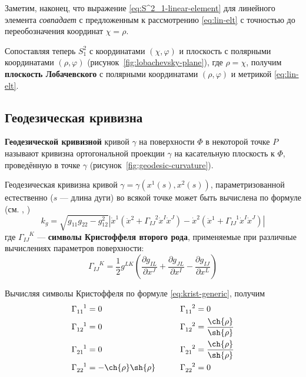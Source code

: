 \documentclass{article}
\numberwithin{equation}{section}
\renewcommand{\phi}{\varphi}
\newcommand{\krist}[3]{\Gamma^{\phantom{#1 #2}#3}_{#1 #2}}
\newcommand{\neword}[1]{\textbf{#1}}
\providecommand{\abs}[1]{\left \lvert{#1}\right \rvert}
\begin{document}
Заметим, наконец, что выражение \eqref{eq:S^2_1-linear-element} для
линейного элемента \emph{совпадает} с предложенным к рассмотрению
\eqref{eq:lin-elt} с точностью до переобозначения координат $\chi =
\rho$.

Сопоставляя теперь $S^2_1$ с координатами $(\chi, \phi)$ и плоскость с
полярными координатами $(\rho, \phi)$
(рисунок \ref{fig:lobachevsky-plane}), где $\rho=\chi$, получим
\neword{плоскость Лобачевского} с полярными координатами $(\rho,
\phi)$ и метрикой \eqref{eq:lin-elt}.

\subsection{Геодезическая кривизна}

\neword{Геодезической кривизной} кривой $\gamma$ на поверхности $\Phi$
в некоторой точке $P$ называют кривизна ортогональной проекции
$\gamma$ на касательную плоскость к $\Phi$, проведённую в точке
$\gamma$ (рисунок \ref{fig:geodesic-curvature}).



Геодезическая кривизна кривой $\gamma = \gamma(x^1(s), x^2(s))$,
параметризованной естественно ($s$ — длина дуги) во всякой точке может
быть вычислена по формуле (см. \cite{pogorelov74}, \cite{rashevsky50})
\begin{equation}\label{eq:geodesic-curvature}
  k_g = \sqrt{g_{11} g_{22} - g_{12}^2}\abs{\dot{x}^1 (\ddot{x}^2 +
    \krist{I}{J}{2} \dot{x}^I \dot{x}^J) - \dot{x}^2 (\ddot{x}^1 +
    \krist{I}{J}{1} \dot{x}^I \dot{x}^J)}
\end{equation}
где $\krist{I}{J}{K}$ — \neword{символы Кристоффеля второго рода},
применяемые при различные вычислениях параметров поверхности:
\begin{equation}\label{eq:krist-generic}
  \krist{I}{J}{K} = \frac{1}{2} g^{LK} \left (
    \frac{\partial{g_{IL}}}{\partial{x^J}} +
    \frac{\partial{g_{JL}}}{\partial{x^I}} -
    \frac{\partial{g_{IJ}}}{\partial{x^L}} \right )
\end{equation}

Вычисляя символы Кристоффеля по формуле \eqref{eq:krist-generic},
получим
\begin{equation}\label{eq:krist}
  \begin{aligned}
    \krist{1}{1}{1} &= 0 &\qquad \krist{1}{1}{2} &= 0 \\
    \krist{1}{2}{1} &= 0 &\qquad \krist{1}{2}{2} &= \frac{\ch{\rho}}{\sh{\rho}} \\
    \krist{2}{1}{1} &= 0 &\qquad \krist{2}{1}{2} &= \frac{\ch{\rho}}{\sh{\rho}} \\
    \krist{2}{2}{1} &= -\ch{\rho} \sh{\rho} &\qquad \krist{2}{2}{2} & = 0
  \end{aligned}
\end{equation}
  
\end{document}
